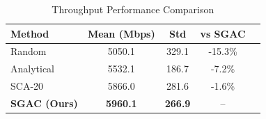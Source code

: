 
\begin{table}[t]
\centering
\caption{Throughput Performance Comparison}
\label{tab:results}
\begin{tabular}{lcccc}
\toprule
\textbf{Method} & \textbf{Mean (Mbps)} & \textbf{Std} & \textbf{vs SGAC} \\
\midrule
Random & 5050.1 & 329.1 & -15.3\% \\
Analytical & 5532.1 & 186.7 & -7.2\% \\
SCA-20 & 5866.0 & 281.6 & -1.6\% \\
\midrule
\textbf{SGAC (Ours)} & \textbf{5960.1} & \textbf{266.9} & -- \\
\bottomrule
\end{tabular}
\end{table}
